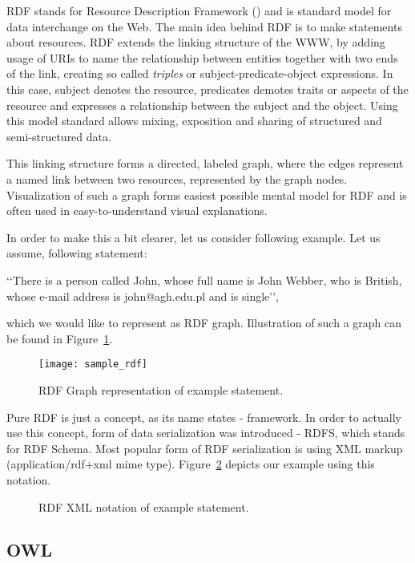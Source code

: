 RDF stands for Resource Description Framework (\cite{rdfPrimer:2004}) and is standard model for data interchange on the Web. The main idea behind RDF is to make statements about resources. RDF extends the linking structure of the WWW, by adding usage of URIs to name the relationship between entities together with two ends of the link, creating so called \emph{triples} or subject-predicate-object expressions. In this case, subject denotes the resource, predicates demotes traits or aspects of the resource and expresses a relationship between the subject and the object. Using this model standard allows mixing, exposition and sharing of structured and semi-structured data.

This linking structure forms a directed, labeled graph, where the edges represent a named link between two resources, represented by the graph nodes. Visualization of such a graph forms easiest possible mental model for RDF and is often used in easy-to-understand visual explanations.

In order to make this a bit clearer, let us consider following example. Let us assume, following statement:

\lq\lq{}There is a person called John, whose full name is John Webber, who is British, whose e-mail address is john@agh.edu.pl and is single\rq\rq{}, 
  
which we would like to represent as RDF graph. Illustration of such a graph can be found in Figure~\ref{fig:sample_rdf}.

\begin{figure}[ht]
  \centering
  \texttt{[image: sample\_rdf]}
  \caption{RDF Graph representation of example statement.}
  \label{fig:sample_rdf}
\end{figure}

Pure RDF is just a concept, as its name states - framework. In order to actually use this concept, form of data serialization was introduced - RDFS, which stands for RDF Schema\cite{rdfRef:2004}. Most popular form of RDF serialization is using XML markup (application/rdf+xml mime type). Figure~\ref{fig:sample_rdf_xml} depicts our example using this notation.

\begin{figure}[ht]
  \centering
  
  \caption{RDF XML notation of example statement.}
  \label{fig:sample_rdf_xml}
\end{figure}


\subsection{OWL}

